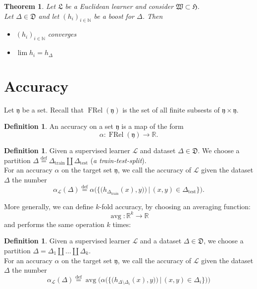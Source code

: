 \documentclass{book}
\theoremstyle{plain}
\newtheorem{theorem}[corollary]{Theorem}
\theoremstyle{definition}
\newtheorem{definition}[corollary]{Definition}
\DeclareMathOperator{\avg}{avg}
\renewcommand{\d}[1]{\mathbb{#1}}
\newcommand{\define}{\stackrel{\operatorname{def}}{=}}
\newcommand{\f}[1]{\mathfrak{#1}}
\DeclareMathOperator{\FRel}{FRel}
\newcommand{\mor}{\longrightarrow}
\renewcommand{\r}[1]{\mathcal{#1}}
\DeclareMathOperator{\test}{test}
\DeclareMathOperator{\train}{train}
\renewcommand{\r}[1]{\mathcal{#1}}
\begin{document}
\begin{theorem}
Let $\f{L}$ be a Euclidean learner and consider $\f{W}\subset \f{H}$.\\ Let $\Delta \in \f{D}$ and let $(h_i)_{i \in \d{N}}$ be a boost for $\Delta$. Then 
\begin{itemize}
\item $(h_i)_{i \in \d{N}}$ converges
\item $\lim h_i = h_\Delta$
\end{itemize}
\end{theorem}






\section{Accuracy}
Let $\f{y}$ be a set. Recall that $\FRel(\f{y})$ is the set of all finite subsests of $\f{y}\times \f{y}$.
\begin{definition}
An accuracy on a set $\f{y}$ is a map of the form
\[
\alpha: \FRel(\f{y})\mor \d{R}.
\]
\end{definition}
\begin{definition}
Given a supervised learner $\r{L}$ and dataset $\Delta \in \f{D}$. We choose a partition $\Delta \define \Delta_{\train}\coprod \Delta_{\test}$ (\emph{a train-test-split}).\\
For an accuracy $\alpha$ on the target set $\f{y}$, we call the accuracy of $\r{L}$ given the dataset $\Delta$ the number
\[
\alpha_\r{L}(\Delta)\define \alpha  \bigg(  \big\{ \big( h_{\Delta_{\train}}  (x),y)  \big) \,\bigg\vert \,(x,y)\in \Delta_{\test} \big\}\bigg).
\]
\end{definition}

\noindent More generally, we can define $k$-fold accuracy, by choosing an averaging function:
\[
\avg: \d{R}^k\mor \d{R}
\]
and performs the same operation $k$ times:
\begin{definition}
Given a supervised learner $\r{L}$ and a dataset $\Delta \in \f{D}$, we choose a partition $\Delta = \Delta_1 \coprod \ldots \coprod \Delta_k$.\\
For an accuracy $\alpha$ on the target set $\f{y}$, we call the accuracy of $\r{L}$ given the dataset $\Delta$ the number
\[
\alpha_\r{L}(\Delta)\define \avg\bigg(\alpha\big(\big\{ \big( h_{\Delta\setminus \Delta_i}(x),y)  \big) \,\bigg\vert \,(x,y)\in \Delta_i \big\}\big)\bigg)
\]
\end{definition}
\end{document}
